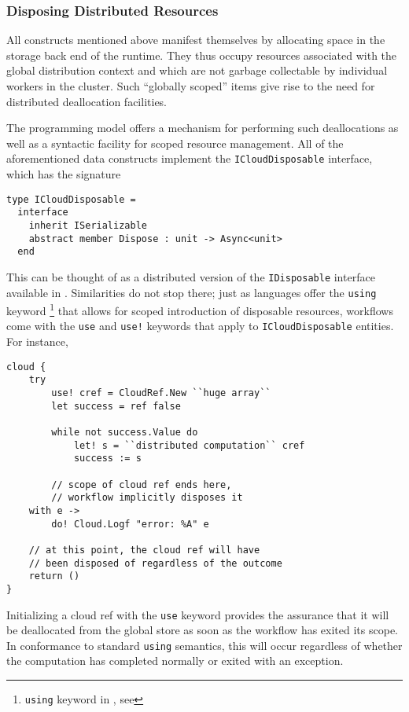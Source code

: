 \subsubsection*{Disposing Distributed Resources}

All constructs mentioned above manifest themselves by allocating space in the
storage back end of the runtime. They thus occupy resources associated with
the global distribution context and which are not garbage collectable by
individual workers in the cluster. Such ``globally scoped'' items give rise
to the need for distributed deallocation facilities.

The \mbrace{} programming model offers a mechanism for performing such deallocations
as well as a syntactic facility for scoped resource management. 
All of the aforementioned data constructs implement the \texttt{ICloudDisposable}
interface, which has the signature
\begin{lstlisting}
type ICloudDisposable =
  interface
    inherit ISerializable
    abstract member Dispose : unit -> Async<unit>
  end
\end{lstlisting}
This can be thought of as a distributed version of the \texttt{IDisposable}
interface available in \dotnet. Similarities do not stop there; just as
\dotnet{} languages offer the \texttt{using} keyword%
\footnote{\texttt{using} keyword in \csharp, see 
} 
that allows for scoped introduction of disposable resources, 
\mbrace{} workflows come with the \texttt{use} and \texttt{use!} keywords that 
apply to \texttt{ICloudDisposable} entities. For instance,
\begin{lstlisting}
cloud {
	try
		use! cref = CloudRef.New ``huge array``
		let success = ref false
	
		while not success.Value do
			let! s = ``distributed computation`` cref
			success := s

		// scope of cloud ref ends here, 
		// workflow implicitly disposes it
	with e ->
		do! Cloud.Logf "error: %A" e
		
	// at this point, the cloud ref will have 
	// been disposed of regardless of the outcome
	return ()
}
\end{lstlisting}
Initializing a cloud ref with the \texttt{use} keyword provides the assurance 
that it will be deallocated from the global store as soon as the workflow has 
exited its scope. In conformance to standard \texttt{using} semantics,
this will occur regardless of whether the computation has completed normally
or exited with an exception.

